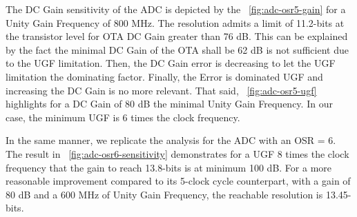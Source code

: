 The DC Gain sensitivity of the ADC is depicted by the \figurename~\ref{fig:adc-osr5-gain} for a Unity Gain Frequency of 800 MHz. The resolution admits a limit of 11.2-bits at the transistor level for OTA DC Gain greater than 76 dB. This can be explained by the fact the minimal DC Gain of the OTA shall be 62 dB is not sufficient due to the UGF limitation. Then, the DC Gain error is decreasing to let the UGF limitation the dominating factor. Finally, the Error is dominated UGF and increasing the DC Gain is no more relevant.
That said, \figurename~\ref{fig:adc-osr5-ugf} highlights for a DC Gain of 80 dB the minimal Unity Gain Frequency. In our case, the minimum UGF is 6 times the clock frequency.

In the same manner, we replicate the analysis for the ADC with an OSR = 6. The result in \figurename~\ref{fig:adc-osr6-sensitivity} demonstrates for a UGF 8 times the clock frequency that the gain to reach 13.8-bits is at minimum 100 dB. For a more reasonable improvement compared to its 5-clock cycle counterpart, with a gain of 80 dB and a 600 MHz of Unity Gain Frequency, the reachable resolution is 13.45-bits.
